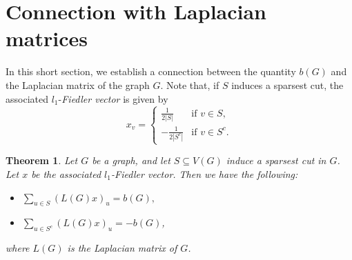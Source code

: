 \documentclass[12pt]{article}
\newtheorem{theorem}{Theorem}[section]
\begin{document}
\section{Connection with Laplacian matrices}
In this short section, we establish a connection between the quantity $b(G)$ and the Laplacian matrix of the graph $G$. Note that, if $S$ induces a sparsest cut, the associated $l_1$-\textit{Fiedler vector} \cite{enide-geir-2024} is given by $$ x_v =
\left\{
	\begin{array}{ll}
		\frac{1}{2|S|}  & \mbox{if } v \in S, \\
	 -\frac{1}{2|S^c|} & \mbox{if } v \in S^c.
	\end{array}
\right.
$$
\begin{theorem}\label{lap-conn}
Let $G$ be a graph, and let $S \subseteq V(G)$ induce a sparsest cut in $G$. Let $x$ be the associated $l_1$-Fiedler vector. Then we have the following:
\begin{itemize}
    \item[(i)] $\sum\limits_{u \in S}(L(G)x)_u=b(G),$
    \item[(ii)] $\sum\limits_{u \in S^c}(L(G)x)_u=-b(G)$,
\end{itemize}    
where $L(G)$ is the Laplacian matrix of $G$.
\end{theorem}
\end{document}
